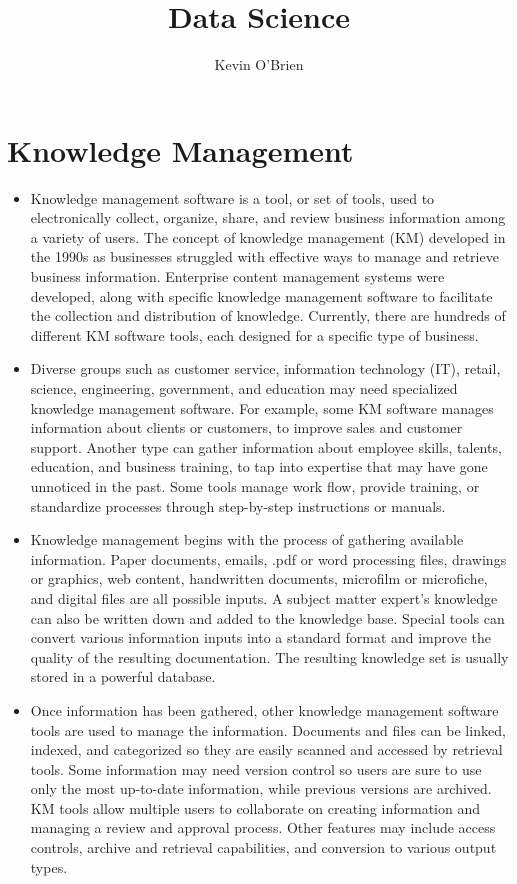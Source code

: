 \documentclass[12pt]{article}
\title{Data Science}
\author{Kevin O'Brien}
\begin{document}
	
\section*{Knowledge Management}

\begin{itemize}
\item Knowledge management software is a tool, or set of tools, used to electronically collect, organize, share, and review business information among a variety of users. The concept of knowledge management (KM) developed in the 1990s as businesses struggled with effective ways to manage and retrieve business information. Enterprise content management systems were developed, along with specific knowledge management software to facilitate the collection and distribution of knowledge. Currently, there are hundreds of different KM software tools, each designed for a specific type of business.


\item Diverse groups such as customer service, information technology (IT), retail, science, engineering, government, and education may need specialized knowledge management software. For example, some KM software manages information about clients or customers, to improve sales and customer support. Another type can gather information about employee skills, talents, education, and business training, to tap into expertise that may have gone unnoticed in the past. Some tools manage work flow, provide training, or standardize processes through step-by-step instructions or manuals.


\item Knowledge management begins with the process of gathering available information. Paper documents, emails, .pdf or word processing files, drawings or graphics, web content, handwritten documents, microfilm or microfiche, and digital files are all possible inputs. A subject matter expert's knowledge can also be written down and added to the knowledge base. Special tools can convert various information inputs into a standard format and improve the quality of the resulting documentation. The resulting knowledge set is usually stored in a powerful database.


\item Once information has been gathered, other knowledge management software tools are used to manage the information. Documents and files can be linked, indexed, and categorized so they are easily scanned and accessed by retrieval tools. Some information may need version control so users are sure to use only the most up-to-date information, while previous versions are archived. KM tools allow multiple users to collaborate on creating information and managing a review and approval process. Other features may include access controls, archive and retrieval capabilities, and conversion to various output types.



\end{itemize}
\end{document}
